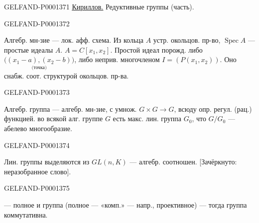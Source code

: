 \begin{GelfandAdjacentEvidence}{GELFAND-P000137}{1}
\underline{\underline{Кириллов.}}  Редуктивные группы (часть).
\end{GelfandAdjacentEvidence}
\begin{GelfandAdjacentEvidence}{GELFAND-P000137}{2}

Алгебр. мн-зие — лок. афф. схема. Из кольца $A$ устр. окольцов. пр-во, $\operatorname{Spec}A$ — простые идеалы $A$.
$A=C[x_1,x_2]$. Простой идеал порожд. либо $\underset{\text{(точка)}}{\bigl((x_1-a),(x_2-b)\bigr)}$, либо неприв. многочленом $I=(P(x_1,x_2))$. Оно снабж. соот. структурой окольцов. пр-ва.
\end{GelfandAdjacentEvidence}
\begin{GelfandAdjacentEvidence}{GELFAND-P000137}{3}


Алгебр. группа — алгебр. мн-зие, с умнож. $G\times G\to G$, всюду опр. регул. (рац.) функцией.
 во всякой алг. группе $G$ есть макс. лин. группа $G_0$, что $G/G_0$ — абелево многообразие.
\end{GelfandAdjacentEvidence}
\begin{GelfandAdjacentEvidence}{GELFAND-P000137}{4}

Лин. группы выделяются из $GL(n,K)$ — алгебр. соотношен. [Зачёркнуто: неразобранное слово].
\end{GelfandAdjacentEvidence}
\begin{GelfandAdjacentEvidence}{GELFAND-P000137}{5}


 — полное и группа (полное — «комп.» — напр., проективное) — тогда группа коммутативна.
\end{GelfandAdjacentEvidence}
